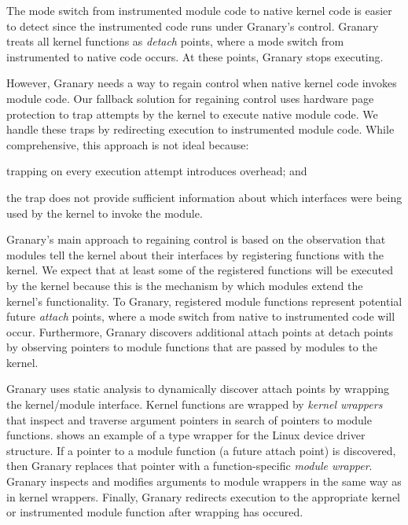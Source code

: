 \documentclass[preprint]{sigplanconf}
\begin{document}
The mode switch from instrumented module code to native kernel code is easier to detect since the instrumented code runs under Granary's control. Granary treats all kernel functions as \emph{detach} points, where a mode switch from instrumented to native code occurs. At these points, Granary stops executing.

However, Granary needs a way to regain control when native kernel code invokes module code. Our fallback solution for regaining control uses hardware page protection to trap attempts by the kernel to execute native module code. We handle these traps by redirecting execution to instrumented module code. While comprehensive, this approach is not ideal because: \begin{inparaenum}[i)]
	\item trapping on every execution attempt introduces overhead; and
	\item the trap does not provide sufficient information about which interfaces were being used by the kernel to invoke the module.
\end{inparaenum}

Granary's main approach to regaining control is based on the observation that modules tell the kernel about their interfaces by registering functions with the kernel. We expect that at least some of the registered functions will be executed by the kernel because this is the mechanism by which modules extend the kernel's functionality. To Granary, registered module functions represent potential future \emph{attach} points, where a mode switch from native to instrumented code will occur. Furthermore, Granary discovers additional attach points at detach points by observing pointers to module functions that are passed by modules to the kernel.

Granary uses static analysis to dynamically discover attach points by wrapping the kernel/module interface. Kernel functions are wrapped by \emph{kernel wrappers} that inspect and traverse argument pointers in search of pointers to module functions.  shows an example of a type wrapper for the Linux device driver structure. If a pointer to a module function (a future attach point) is discovered, then Granary replaces that pointer with a function-specific \emph{module wrapper}. Granary inspects and modifies arguments to module wrappers in the same way as in kernel wrappers. Finally, Granary redirects execution to the appropriate kernel or instrumented module function after wrapping has occured.
\end{document}
